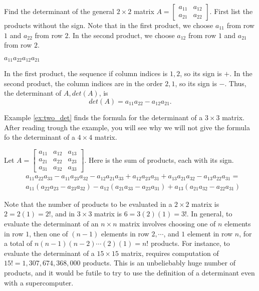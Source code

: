 \documentclass[../main.tex]{subfiles}
\begin{document}
\begin{example} \label{ex:two_det} Find the determinant of the general \(2 \times 2\) matrix \(A = 
  \begin{bmatrix}
  a_{11} & a_{12} \\
  a_{21} & a_{22} 
  \end{bmatrix} 
  \).
  First list the products without the sign. Note that in the first product, we choose \(a_{11}\) from row \(1\) and \(a_{22}\) from row \(2\). In the second product, we choose \(a_{12}\) from row \(1\) and \(a_{21}\) from row \(2\).
  
\(a_{11}a_{22}	a_{12}a_{21}\)

In the first product, the sequence if column indices is \(1, 2\), so its sign is \(+\). In the second product, the column indices are in the order \(2, 1\), so its sign is \(-\). Thus, the determinant of \(A, det(A)\), is \[det(A) = a_{11}a_{22} - a_{12}a_{21}.\]
\end{example}

Example \ref{ex:two_det} finds the formula for the determinant of a \(3 \times 3\) matrix. After reading trough the example, you will see why we will not give the formula fo the determinant of a \(4 \times 4\) matrix.

\begin{example} \label{ex:three_det} Let \(A = 
  \begin{bmatrix}
  a_{11} & a_{12} & a_{13} \\
  a_{21} & a_{22} & a_{23} \\
  a_{31} & a_{32} & a_{33} 
  \end{bmatrix}
  \). Here is the sum of products, each with its sign.
  \begin{equation*}
    \begin{aligned}
      &a_{11}a_{22}a_{33} - a_{11}a_{23}a_{32} - a_{12}a_{21}a_{33} + a_{12}a_{23}a_{31} + a_{13}a_{21}a_{32} - a_{13}a_{22}a_{31} = \\ 
      &a_{11}(a_{22}a_{23} - a_{23}a_{32}) - a_{12}(a_{21}a_{33} - a_{23}a_{31}) + a_{13}(a_{21}a_{32} - a_{22}a_{31})
    \end{aligned}  
  \end{equation*}
\end{example}
  Note that the number of products to be evaluated in a \(2 \times 2\) matrix is \(2 = 2(1) = 2!\), and in \(3 \times 3\) matrix is \(6 = 3(2)(1) = 3!\). In general, to evaluate the determinant of an \(n \times n\) matrix involves choosing one of \(n\) elements in row \(1\), then one of \((n - 1)\) elements in row \(2, \cdots\), and \(1\) element in row \(n\), for a total of \(n(n-1)(n-2)\cdots(2)(1) = n!\) products. For instance, to evaluate the determinant of a \(15 \times 15\) matrix, requires computation of \(15! = 1,307,674,368,000\) products. This is an unbeliebably huge number of products, and it would be futile to try to use the definition of a determinant even with a supercomputer.
  
\end{document}
